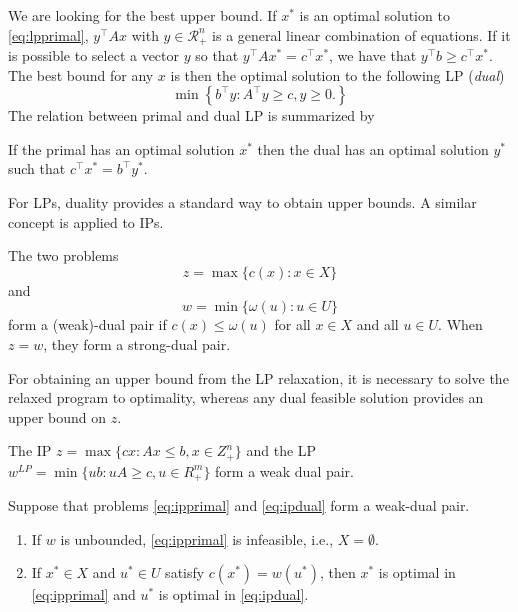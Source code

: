 We are looking for the best upper bound. 
If $x^*$ is an optimal solution to \eqref{eq:lpprimal}, $y^\top Ax$ with $y\in \mathcal{R}^n_+$ is a general linear combination of equations.
If it is possible to select a vector $y$ so that $y^\top Ax^*=c^\top x^*$, we have that $y^\top b \geq c^\top x^*$.
The best bound for any $x$ is then the optimal solution to the following LP (\emph{dual})
\begin{equation}
	\min \left\{b^\top y :  A^\top y \geq c, y   \geq 0.\right\} 
\label{eq:lpdual}
\end{equation}
The relation between primal and dual LP is summarized by
\begin{proposition}
If the primal has an optimal solution $x^*$ then the dual has an optimal solution $y^*$ such that $c^\top x^* = b^\top y^*$.
\end{proposition}
For LPs, duality provides a standard way to obtain upper bounds.
A similar concept is applied to IPs.
\begin{definition}\cite{wolsey98}
The two problems
\begin{equation}\label{eq:ipprimal}
	z=\max\{c(x): x\in X\}
\end{equation}
and
\begin{equation}\label{eq:ipdual}
	w=\min\{\omega(u): u\in U\}
\end{equation}
form a (weak)-dual pair if $c(x)\leq \omega(u)$ for all $x\in X$ and all $u\in U$. 
When $z=w$, they form a strong-dual pair.
\end{definition}
For obtaining an upper bound from the LP relaxation, it is necessary to solve the relaxed program to optimality, whereas any dual feasible solution provides an upper bound on $z$.
\begin{proposition}\cite{wolsey98}
The IP $z=\max\{cx: Ax\leq b, x\in Z^n_+\}$ and the LP $w^{LP}=\min\{ub:uA\geq c, u\in R^m_+\}$ form a weak dual pair.
\end{proposition}
\begin{proposition}\cite{wolsey98}
Suppose that problems \eqref{eq:ipprimal} and \eqref{eq:ipdual} form a weak-dual pair.
\begin{enumerate}
	\item If $w$ is unbounded, \eqref{eq:ipprimal} is infeasible, i.e., $X=\emptyset$.
	\item If $x^*\in X$ and $u^*\in U$ satisfy $c(x^*)=w(u^*)$, then $x^*$ is optimal in \eqref{eq:ipprimal} and $u^*$ is optimal in \eqref{eq:ipdual}.
\end{enumerate}
\end{proposition}

